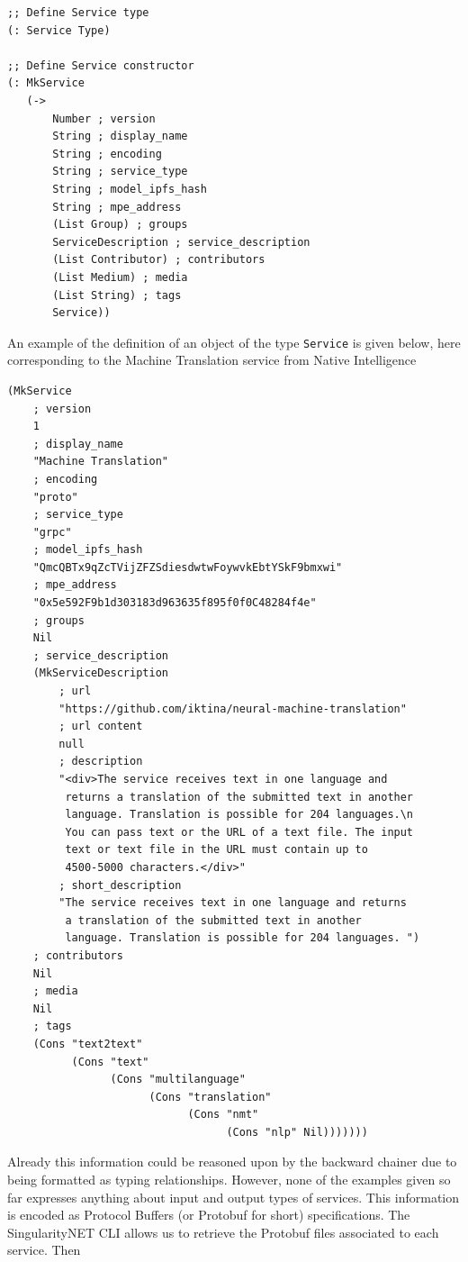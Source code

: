 \documentclass[]{report}
\begin{document}
\begin{verbatim}
;; Define Service type
(: Service Type)

;; Define Service constructor
(: MkService
   (->
       Number ; version
       String ; display_name
       String ; encoding
       String ; service_type
       String ; model_ipfs_hash
       String ; mpe_address
       (List Group) ; groups
       ServiceDescription ; service_description
       (List Contributor) ; contributors
       (List Medium) ; media
       (List String) ; tags
       Service))
\end{verbatim}
An example of the definition of an object of the type
\texttt{Service} is given below, here corresponding to the
Machine Translation service from Native Intelligence
\begin{verbatim}
(MkService
    ; version
    1
    ; display_name
    "Machine Translation"
    ; encoding
    "proto"
    ; service_type
    "grpc"
    ; model_ipfs_hash
    "QmcQBTx9qZcTVijZFZSdiesdwtwFoywvkEbtYSkF9bmxwi"
    ; mpe_address
    "0x5e592F9b1d303183d963635f895f0f0C48284f4e"
    ; groups
    Nil
    ; service_description
    (MkServiceDescription
        ; url
        "https://github.com/iktina/neural-machine-translation"
        ; url content
        null
        ; description
        "<div>The service receives text in one language and
         returns a translation of the submitted text in another
         language. Translation is possible for 204 languages.\n
         You can pass text or the URL of a text file. The input
         text or text file in the URL must contain up to
         4500-5000 characters.</div>"
        ; short_description
        "The service receives text in one language and returns
         a translation of the submitted text in another
         language. Translation is possible for 204 languages. ")
    ; contributors
    Nil
    ; media
    Nil
    ; tags
    (Cons "text2text"
          (Cons "text"
                (Cons "multilanguage"
                      (Cons "translation"
                            (Cons "nmt"
                                  (Cons "nlp" Nil)))))))
\end{verbatim}
Already this information could be reasoned upon by the backward
chainer due to being formatted as typing relationships.  However, none
of the examples given so far expresses anything about input and output
types of services.  This information is encoded as Protocol Buffers
(or Protobuf for short) specifications.  The SingularityNET CLI allows
us to retrieve the Protobuf files associated to each service.  Then
\end{document}
